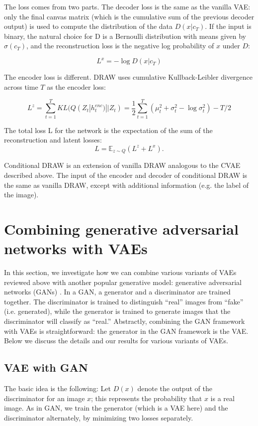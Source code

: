 \documentclass[10pt]{article}
\newcommand{\E}{\mathbb{E}}
\begin{document}
The loss comes from two parts. The decoder loss is the same as the vanilla VAE: only the final canvas matrix (which is the cumulative sum of the previous decoder output) is used to compute the distribution of the data $D(x|c_T)$. If the input is binary, the natural choice for D is a Bernoulli distribution with means given by $\sigma(c_T)$, and the reconstruction loss is the negative log probability of $x$ under $D$:

$$L^{x} = - \log D(x|c_T)$$

The encoder loss is different. DRAW uses cumulative Kullback-Leibler divergence across time $T$ as the encoder loss:

$$L^z = \sum_{t=1}^{T} KL(Q(Z_t|h_{t}^{enc})||Z_t) = \frac{1}{2}\sum_{t=1}^{T}(\mu_t^2 + \sigma_t^2 - \log \sigma^2_t) - T/2$$

The total loss L for the network is the expectation of the sum of the reconstruction and latent losses:
$$L = \E_{z \sim Q} (L^z + L^x).$$

Conditional DRAW is an extension of vanilla DRAW analogous to the CVAE described above. The input of the encoder and decoder of conditional DRAW is the same as vanilla DRAW, except with additional information (e.g. the label of the image).







\section{Combining generative adversarial networks with VAEs}

In this section, we investigate how we can combine various variants of VAEs reviewed above with another popular generative model: generative adversarial networks (GANs) \cite{goodfellow2014gan}. In a GAN, a generator and a discriminator are trained together.
The discriminator is trained to distinguish ``real'' images from ``fake'' (i.e. generated), while the generator is trained to generate images that the discriminator will classify as ``real.''
Abstractly, combining the GAN framework with VAEs is straightforward: the generator in the GAN framework is the VAE. Below we discuss the details and our results for various variants of VAEs.

\subsection{VAE with GAN}
The basic idea is the following: Let $D(x)$ denote the output of the discriminator for an image $x$; this represents the probability that $x$ is a real image. As in GAN, we train the generator (which is a VAE here) and the discriminator alternately, by minimizing two losses separately.
\end{document}
